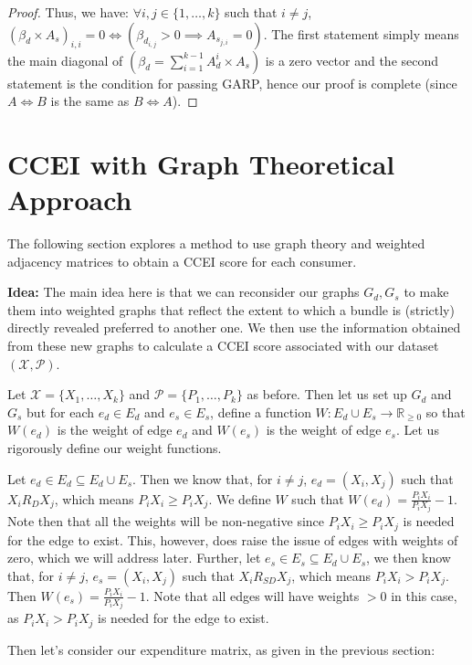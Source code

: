 \documentclass{article} %
\begin{document}
\begin{proof}
Thus, we have: $\forall i, j\in\{1,\ldots,k\}$ such that $i\not=j$, $(\beta_d\times A_s)_{i,i}=0 \iff (\beta_{d_{i,j}}>0 \implies A_{s_{j,i}}=0)$. The first statement simply means the main diagonal of $(\beta_d=\sum_{i=1}^{k-1}A_{d}^{i}\times A_s)$ is a zero vector and the second statement is the condition for passing GARP, hence our proof is complete (since $A\iff B$ is the same as $B\iff A$).
\end{proof}

\section{CCEI with Graph Theoretical Approach}

The following section explores a method to use graph theory and weighted adjacency matrices to obtain a CCEI score for each consumer. 
\bigskip

\textbf{Idea:} The main idea here is that we can reconsider our graphs $G_d, G_s$ to make them into weighted graphs that reflect the extent to which a bundle is (strictly) directly revealed preferred to another one. We then use the information obtained from these new graphs to calculate a CCEI score associated with our dataset $(\mathcal{X},\mathcal{P})$.
\bigskip

Let $\mathcal{X}=\{X_1,\ldots,X_k\}$ and $\mathcal{P}=\{P_1,\ldots,P_k\}$ as before. Then let us set up $G_d$ and $G_s$ but for each $e_d\in E_d$ and $e_s\in E_s$, define a function $W:E_d \cup E_s\to\mathbb{R}_{\geq0}$ so that $W(e_d)$ is the weight of edge $e_d$ and $W(e_s)$ is the weight of edge $e_s$. Let us rigorously define our weight functions.
\bigskip

Let $e_d \in E_d \subseteq E_d\cup E_s$. Then we know that, for $i\not=j$, $e_d=(X_i, X_j)$ such that $X_i R_D X_j$, which means $P_iX_i\geq P_iX_j$. We define $W$ such that $W(e_d)=\frac{P_iX_i}{P_iX_j}-1$. Note then that all the weights will be non-negative since $P_iX_i\geq P_iX_j$ is needed for the edge to exist. This, however, does raise the issue of edges with weights of zero, which we will address later. Further, let $e_s\in E_s\subseteq E_d\cup E_s$, we then know that, for $i\not=j$, $e_s=(X_i, X_j)$ such that $X_i R_{SD} X_j$, which means $P_iX_i>P_iX_j$. Then $W(e_s)=\frac{P_iX_i}{P_iX_j}-1$. Note that all edges will have weights $>0$ in this case, as $P_iX_i>P_iX_j$ is needed for the edge to exist.
\bigskip

Then let's consider our expenditure matrix, as given in the previous section:
\end{document}
